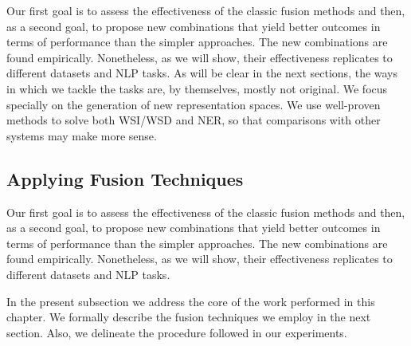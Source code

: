 Our first goal is to assess the effectiveness of the classic fusion methods and then, as a second goal, to propose new combinations that yield better outcomes in terms of performance than the simpler approaches. The new combinations are found empirically. Nonetheless, as we will show, their effectiveness replicates to different datasets and NLP tasks. As will be clear in the next sections, the ways in which we tackle the tasks are, by themselves, mostly not original. We focus specially on the generation of new representation spaces. We use well-proven methods to solve both WSI/WSD and NER, so that comparisons with other systems may make more sense.
%
%



\subsection{Applying Fusion Techniques}
\label{chap6:application}
 Our first goal is to assess the effectiveness of the classic fusion methods and then, as a second goal, to propose new combinations that yield better outcomes in terms of performance than the simpler approaches. The new combinations are found empirically. Nonetheless, as we will show, their effectiveness replicates to different datasets and NLP tasks. 

In the present subsection we address the core of the work performed in this chapter.
We formally describe the fusion techniques we employ in the next section. Also, we  delineate the procedure followed in our experiments. 


